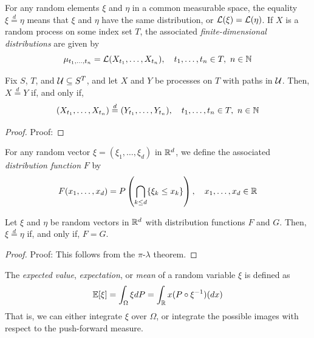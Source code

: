 
\begin{definition}
    For any random elements $\xi$ and $\eta$ in a common measurable space, the equality $\xi \overset{d}{=} \eta$ means that $\xi$ and $\eta$ have the same distribution, or $\cal{L}(\xi) = \cal{L}(\eta)$. If $X$ is a random process on some index set $T$, the associated \emph{finite-dimensional distributions} are given by
    \[ \mu_{t_1, \ldots, t_n} = \cal{L}(X_{t_1}, \ldots, X_{t_n}), \quad t_1, \ldots, t_n \in T,\ n \in \N \]
\end{definition}


\begin{lemma}
    Fix $S$, $T$, and $\cal{U} \subseteq S^{T}$, and let $X$ and $Y$ be processes on $T$ with paths in $\cal{U}$. Then, $X \overset{d}{=} Y$ if, and only if,
    \[ (X_{t_1}, \ldots, X_{t_n}) \overset{d}{=} (Y_{t_1}, \ldots, Y_{t_n}), \quad t_1, \ldots, t_n \in T,\ n \in \N \]
\end{lemma}
\begin{proof}{Proof:}
\end{proof}

\begin{definition}
    For any random vector $\xi = (\xi_1, \ldots, \xi_d)$ in $\R^{d}$, we define the associated \emph{distribution function} $F$ by
    \[ F(x_1, \ldots, x_d) = P\left(\bigcap_{k \leq d} \{\xi_k \leq x_k\}\right), \quad x_1, \ldots, x_d \in \R \]
\end{definition}

\begin{lemma}
    Let $\xi$ and $\eta$ be random vectors in $\R^{d}$ with distribution functions $F$ and $G$. Then, $\xi \overset{d}{=} \eta$ if, and only if, $F = G$.
\end{lemma}
\begin{proof}{Proof:}
    This follows from the $\pi$-$\lambda$ theorem.
\end{proof}

\begin{definition}
    The \emph{expected value}, \emph{expectation}, or \emph{mean} of a random variable $\xi$ is defined as
    \[ \mathbb{E}[\xi] = \int_{\Omega} \xi dP = \int_{\R} x (P \circ \xi^{-1})(dx) \]
    That is, we can either integrate $\xi$ over $\Omega$, or integrate the possible images with respect to the push-forward measure.
\end{definition}

